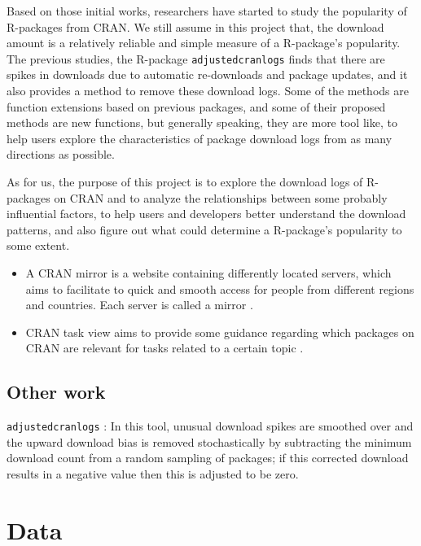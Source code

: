 \documentclass[
]{book}
\begin{document}
Based on those initial works, researchers have started to study the popularity of R-packages from CRAN. We still assume in this project that, the download amount is a relatively reliable and simple measure of a R-package's popularity. The previous studies, the R-package \texttt{adjustedcranlogs}\autocite{adjustedcranlogs} finds that there are spikes in downloads due to automatic re-downloads and package updates, and it also provides a method to remove these download logs. Some of the methods are function extensions based on previous packages, and some of their proposed methods are new functions, but generally speaking, they are more tool like, to help users explore the characteristics of package download logs from as many directions as possible.

As for us, the purpose of this project is to explore the download logs of R-packages on CRAN and to analyze the relationships between some probably influential factors, to help users and developers better understand the download patterns, and also figure out what could determine a R-package's popularity to some extent.

\begin{itemize}
\item
  A CRAN mirror is a website containing differently located servers, which aims to facilitate to quick and smooth access for people from different regions and countries. Each server is called a mirror \autocite{cranmirror}.
\item
  CRAN task view aims to provide some guidance regarding which packages on CRAN are relevant for tasks related to a certain topic \autocite{crantaskviews}.
\end{itemize}

\hypertarget{other-work}{%
\section{Other work}\label{other-work}}

\texttt{adjustedcranlogs}\autocite{adjustedcranlogs} : In this tool, unusual download spikes are smoothed over and the upward download bias is removed stochastically by subtracting the minimum download count from a random sampling of packages; if this corrected download results in a negative value then this is adjusted to be zero.

\hypertarget{data}{%
\chapter{Data}\label{data}}
\end{document}
